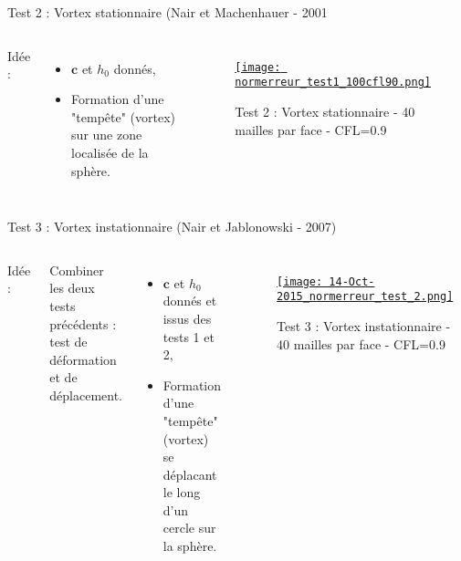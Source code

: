 \documentclass[11pt]{beamer}
\begin{document}
\begin{frame}{Test 2 : Vortex stationnaire (Nair et Machenhauer - 2001}
\begin{columns}
Idée :

\begin{itemize}
\item $\mathbf{c}$ et $h_0$ donnés,

\item Formation d'une "tempête" (vortex) sur une zone localisée de la sphère.
\end{itemize}



\begin{figure}
\href{run:CSapprox_test1.avi}{\texttt{[image: normerreur\_test1\_100cfl90.png]}} 
\caption{Test 2 : Vortex stationnaire - 40 mailles par face - CFL=0.9}
\end{figure}
\end{columns}
\end{frame}


\begin{frame}{Test 3 : Vortex instationnaire (Nair et Jablonowski - 2007)}
\begin{columns}
Idée :

Combiner les deux tests précédents : test de déformation et de déplacement.
\begin{itemize}

\item $\mathbf{c}$ et $h_0$ donnés et issus des tests 1 et 2,

\item Formation d'une "tempête" (vortex) se déplacant le long d'un cercle sur la sphère.
\end{itemize}



\begin{figure}
\href{run:CSapprox_test2.avi}{\texttt{[image: 14-Oct-2015\_normerreur\_test\_2.png]}} 
\caption{Test 3 : Vortex instationnaire - 40 mailles par face - CFL=0.9}
\end{figure}
\end{columns}
\end{frame}
\end{document}
